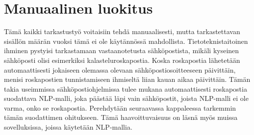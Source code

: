 \section{Manuaalinen luokitus}

Tämä kaikki tarkastustyö voitaisiin tehdä manuaalisesti, mutta tarkastettavan sisällön määrän vuoksi tämä ei ole käytännössä mahdollista. Tietoteknistaitoinen ihminen pystyisi tarkastamaan vastaanotetusta sähköpostista, mikäli kyseinen sähköposti olisi esimerkiksi kalasteluroskapostia. Koska roskapostia lähetetään automaattisesti jokaiseen olemassa olevaan sähköpostiosoitteeseen päivittäin, menisi roskapostien tunnistamiseen ihmiseltä liian kauan aikaa päivittäin. Tämän takia useimmissa sähköpostiohjelmissa tulee mukana automaattisesti roskapostia suodattava NLP-malli, joka päästää läpi vain sähköpostit, joista NLP-malli ei ole varma, onko se roskapostia. Perehdytään seuraavassa kappaleessa tarkemmin tämän suodattimen ohitukseen. Tämä haavoittuvaisuus on läsnä myös muissa sovelluksissa, joissa käytetään NLP-mallia.